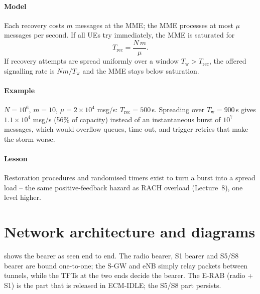 \documentclass[11pt,a4paper]{article}
\begin{document}
\paragraph{Model} Each recovery costs $m$ messages at the MME; the MME processes at most $\mu$ messages
per second. If all UEs try immediately, the MME is saturated for
\begin{equation}\label{eq:storm}
  T_{\mathrm{rec}} = \frac{N\,m}{\mu}.
\end{equation}
If recovery attempts are spread uniformly over a window $T_\mathrm{w} > T_{\mathrm{rec}}$, the offered
signalling rate is $N m/T_\mathrm{w}$ and the MME stays below saturation.
\paragraph{Example} $N = 10^6$, $m = 10$, $\mu = 2\times10^4$ msg/s: $T_{\mathrm{rec}} = 500$\,s. Spreading
over $T_\mathrm{w} = 900$\,s gives $1.1\times10^4$ msg/s (56\% of capacity) instead of an instantaneous burst
of $10^7$ messages, which would overflow queues, time out, and trigger retries that make the storm worse.
\paragraph{Lesson} Restoration procedures and randomised timers exist to turn a burst into a spread
load -- the same positive-feedback hazard as RACH overload (Lecture~8), one level higher.

\section{Network architecture and diagrams}
 shows the bearer as seen end to end. The radio bearer, S1 bearer and S5/S8 bearer
are bound one-to-one; the S-GW and eNB simply relay packets between tunnels, while the TFTs at the two
ends decide the bearer. The E-RAB (radio + S1) is the part that is released in ECM-IDLE; the S5/S8
part persists.

\begin{acnfigure}
  \caption{EPS bearer structure with a default and a dedicated bearer. The UL TFT in the UE and the DL TFT
  in the P-GW map IP flows to bearers.}
  \label{fig:bearer}
\end{acnfigure}

\begin{acnfigure}
  \caption{EPS key hierarchy. Key lengths in bits; algorithm keys are truncated to 128 bits.}
  \label{fig:keys}
\end{acnfigure}
\end{document}
